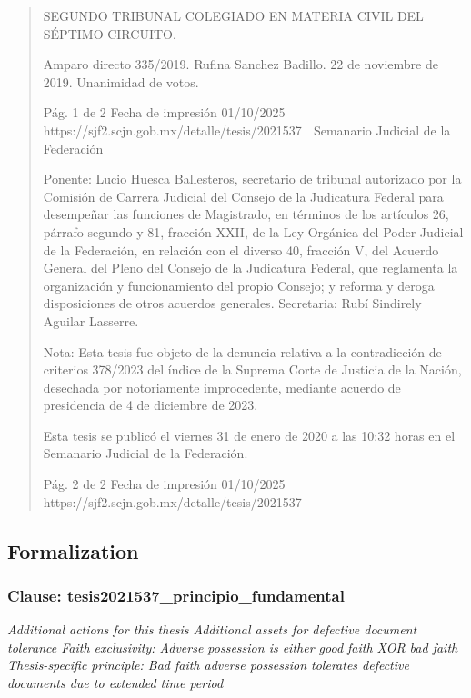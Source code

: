 \documentclass[11pt,a4paper]{article}
\begin{document}
\begin{quote}
SEGUNDO TRIBUNAL COLEGIADO EN MATERIA CIVIL DEL SÉPTIMO CIRCUITO.


Amparo directo 335/2019. Rufina Sanchez Badillo. 22 de noviembre de 2019. Unanimidad de votos.

                                              Pág. 1 de 2              Fecha de impresión 01/10/2025
  https://sjf2.scjn.gob.mx/detalle/tesis/2021537
                                                   Semanario Judicial de la Federación

Ponente: Lucio Huesca Ballesteros, secretario de tribunal autorizado por la Comisión de Carrera
Judicial del Consejo de la Judicatura Federal para desempeñar las funciones de Magistrado, en
términos de los artículos 26, párrafo segundo y 81, fracción XXII, de la Ley Orgánica del Poder
Judicial de la Federación, en relación con el diverso 40, fracción V, del Acuerdo General del Pleno
del Consejo de la Judicatura Federal, que reglamenta la organización y funcionamiento del propio
Consejo; y reforma y deroga disposiciones de otros acuerdos generales. Secretaria: Rubí Sindirely
Aguilar Lasserre.

Nota: Esta tesis fue objeto de la denuncia relativa a la contradicción de criterios 378/2023 del índice
de la Suprema Corte de Justicia de la Nación, desechada por notoriamente improcedente, mediante
acuerdo de presidencia de 4 de diciembre de 2023.


Esta tesis se publicó el viernes 31 de enero de 2020 a las 10:32 horas en el Semanario Judicial de
la Federación.




                                              Pág. 2 de 2             Fecha de impresión 01/10/2025
  https://sjf2.scjn.gob.mx/detalle/tesis/2021537

\end{quote}

\subsection{Formalization}

\subsubsection{Clause: tesis2021537\_principio\_fundamental}

\textit{Additional actions for this thesis Additional assets for defective document tolerance Faith exclusivity: Adverse possession is either good faith XOR bad faith Thesis-specific principle: Bad faith adverse possession tolerates defective documents due to extended time period}
\end{document}
